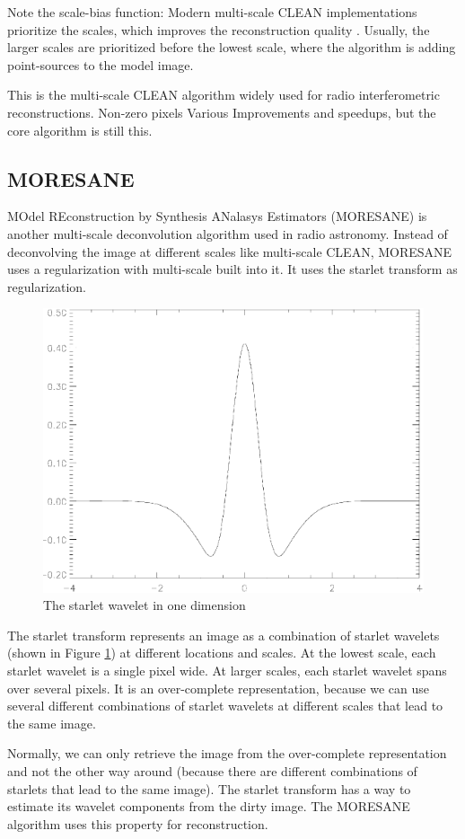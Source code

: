 Note the scale-bias function: Modern multi-scale CLEAN implementations prioritize the scales, which improves the reconstruction quality \cite{offringa2017optimized}. Usually, the larger scales are prioritized before the lowest scale, where the algorithm is adding point-sources to the model image. 

This is the multi-scale CLEAN algorithm widely used for radio interferometric reconstructions.
Non-zero pixels
Various Improvements and speedups, but the core algorithm is still this.

\subsection{MORESANE}
MOdel REconstruction by Synthesis ANalasys Estimators (MORESANE) is another multi-scale deconvolution algorithm used in radio astronomy. Instead of deconvolving the image at different scales like multi-scale CLEAN, MORESANE uses a regularization with multi-scale built into it. It uses the starlet transform \cite{starck2015starlet} as regularization.

\begin{figure}[h]
	\centering
	\includegraphics[width=0.3\linewidth]{./chapters/02.state/wavelet.png}
	\caption{The starlet wavelet in one dimension}
	\label{state:moresane:starlet}
\end{figure}

The starlet transform represents an image as a combination of starlet wavelets (shown in Figure \ref{state:moresane:starlet}) at different locations and scales. At the lowest scale, each starlet wavelet is a single pixel wide. At larger scales, each starlet wavelet spans over several pixels. It is an over-complete representation, because we can use several different combinations of starlet wavelets at different scales that lead to the same image.

Normally, we can only retrieve the image from the over-complete representation and not the other way around (because there are different combinations of starlets that lead to the same image). The starlet transform has a way to estimate its wavelet components from the dirty image. The MORESANE algorithm uses this property for reconstruction.

